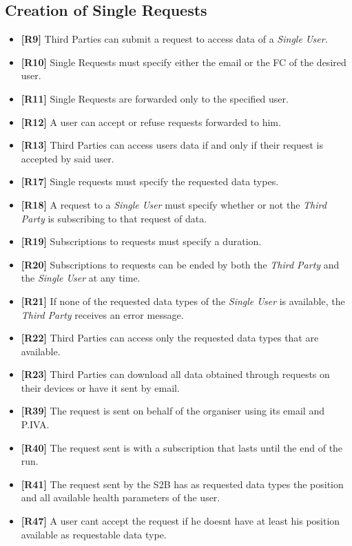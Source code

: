 \documentclass[titlepage]{article}
\begin{document}
	\subsection{Creation of Single Requests}
	\begin{itemize}
		\item {\bf [R9]} Third Parties can submit a request to access data of a {\it Single User}. 
		\item {\bf [R10]} Single Requests must specify either the email or the FC of the desired user.
		\item {\bf [R11]} Single Requests are forwarded only to the specified user.
		\item {\bf [R12]} A user can accept or refuse requests forwarded to him. 
		\item {\bf [R13]} Third Parties can access user\textsc{}s data if and only if their request is accepted by said user. 
		\item {\bf [R17]} Single requests must specify the requested data types. 
		\item {\bf [R18]} A request to a {\it Single User} must specify whether or not the {\it Third Party} is subscribing to that request of data.
		\item {\bf [R19]} Subscriptions to requests must specify a duration.
		\item {\bf [R20]} Subscriptions to requests can be ended by both the {\it Third Party} and the {\it Single User} at any time.
		\item {\bf [R21]} If none of the requested data types of the {\it Single User} is available, the {\it Third Party} receives an error message.
		\item {\bf [R22]} Third Parties can access only the requested data types that are available.
		\item {\bf [R23]} Third Parties can download all data obtained through requests on their devices or have it sent by email.
		\item {\bf [R39]} The request is sent on behalf of the organiser using its email and P.IVA.
		\item {\bf [R40]} The request sent is with a subscription that lasts until the end of the run.
		\item {\bf [R41]} The request sent by the S2B has as requested data types the position and all available health parameters of the user.
		\item {\bf [R47]} A user can\textsc{}t accept the request if he doesn\textsc{}t have at least his position available as requestable data type.
	\end{itemize}	
	
\end{document}
